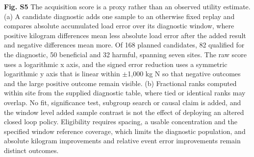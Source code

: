 \documentclass[lineno,pdflatex,sn-apa]{sn-jnl}%
\theoremstyle{thmstyleone}%
\theoremstyle{thmstyletwo}%
\theoremstyle{thmstylethree}%
\begin{document}
\noindent\textbf{Fig. S5} The acquisition score is a proxy rather than an observed utility estimate. (a) A candidate diagnostic adds one sample to an otherwise fixed replay and compares absolute accumulated load error over its diagnostic window, where positive kilogram differences mean less absolute load error after the added result and negative differences mean more. Of 168 planned candidates, 82 qualified for the diagnostic, 50 beneficial and 32 harmful, spanning seven sites. The raw score uses a logarithmic x axis, and the signed error reduction uses a symmetric logarithmic y axis that is linear within $\pm$1,000 kg N so that negative outcomes and the large positive outcome remain visible. (b) Fractional ranks computed within site from the supplied diagnostic table, where tied or identical ranks may overlap. No fit, significance test, subgroup search or causal claim is added, and the window level added sample contrast is not the effect of deploying an altered closed loop policy. Eligibility requires spacing, a usable concentration and the specified window reference coverage, which limits the diagnostic population, and absolute kilogram improvements and relative event error improvements remain distinct outcomes.


\end{document}
